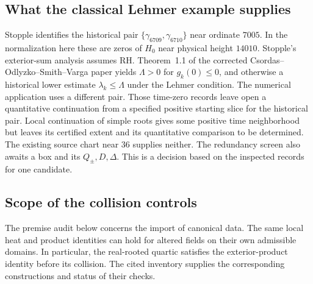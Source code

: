 \subsection{What the classical Lehmer example supplies}

Stopple identifies the historical pair
\(\{\gamma_{6709},\gamma_{6710}\}\) near ordinate \(7005\).
In the normalization here these are zeros of \(H_0\) near
physical height \(14010\). Stopple's exterior-sum analysis assumes
RH. Theorem~1.1 of the corrected Csordas--Odlyzko--Smith--Varga
paper yields \(\Lambda>0\) for \(g_k(0)\le0\), and otherwise a
historical lower estimate \(\lambda_k\le\Lambda\) under the
Lehmer condition. The numerical application uses a different pair.
Those time-zero records leave open a
quantitative continuation from a specified positive starting slice
for the historical pair. Local continuation of simple roots gives
some positive time neighborhood but leaves its certified extent
and its quantitative comparison to be determined. The existing
source chart near \(36\) supplies neither. The redundancy screen
also awaits a box and its \(Q_\pm,D,\Delta\). This is a decision
based on the inspected records for one candidate.
\cite{COSV,Stopple,OARecord}

\subsection{Scope of the collision controls}

The premise audit below concerns the import of canonical data.
The same local heat and product identities can hold for altered
fields on their own admissible domains. In particular, the real-rooted
quartic satisfies the exterior-product identity before its collision.
The cited inventory supplies the corresponding constructions and
status of their checks. \cite{ControlInventory}


